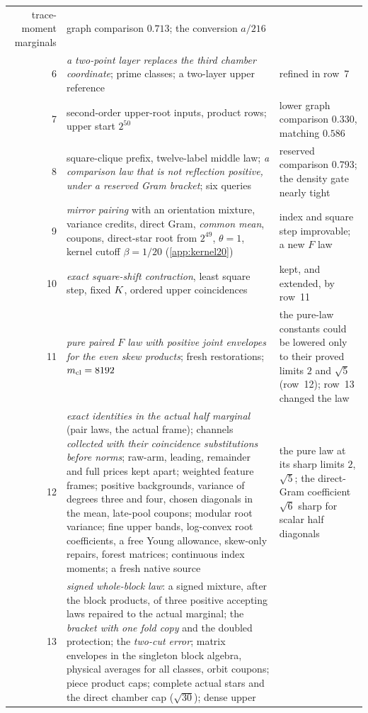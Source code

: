 {\begin{longtable}{@{}r>{\raggedright\arraybackslash}p{}>{\raggedright\arraybackslash}p{}@{}}
 trace-moment marginals & graph comparison $0.713$; the conversion $a/216$\\
6 & \emph{a two-point layer replaces the third chamber coordinate}; prime
 classes; a two-layer upper reference & refined in row~7\\
7 & second-order upper-root inputs, product rows; upper start $2^{50}$ &
 lower graph comparison $0.330$, matching $0.586$\\
8 & square-clique prefix, twelve-label middle law; \emph{a comparison law that
 is not reflection positive, under a reserved Gram bracket}; six queries &
 reserved comparison $0.793$; the density gate nearly tight\\
9 & \emph{mirror pairing} with an orientation mixture, variance credits,
 direct Gram, \emph{common mean}, coupons, direct-star root from $2^{49}$,
 $\theta=1$, kernel cutoff $\beta=1/20$ (\cref{app:kernel20}) &
 index and square step improvable; a new $F$ law\\
10 & \emph{exact square-shift contraction}, least square step, fixed $K$,
 ordered upper coincidences & kept, and extended, by row~11\\
11 & \emph{pure paired $F$ law with positive joint envelopes for the even skew
 products}; fresh restorations; $m_{\mathrm{cl}}=8192$ &
 the pure-law constants could be lowered only to their proved limits $2$ and
 $\sqrt5$ (row~12); row~13 changed the law\\
12 & \emph{exact identities in the actual half marginal} (pair laws, the actual
 frame); channels \emph{collected with their coincidence substitutions before
 norms}; raw-arm, leading, remainder and full prices kept apart; weighted
 feature frames; positive backgrounds, variance of degrees three and four,
 chosen diagonals in the mean, late-pool coupons; modular root variance; fine
 upper bands, log-convex root coefficients, a free Young allowance, skew-only
 repairs, forest matrices; continuous index moments; a fresh native source &
 the pure law at its sharp limits $2$, $\sqrt5$; the direct-Gram coefficient
 $\sqrt6$ sharp for scalar half diagonals\\
13 & \emph{signed whole-block law}: a signed mixture, after the block products,
 of three positive accepting laws repaired to the actual marginal; the
 \emph{bracket with one fold copy} and the doubled protection; the
 \emph{two-cut error}; matrix envelopes in the singleton block algebra,
 physical averages for all classes, orbit coupons; piece product caps;
 complete actual stars and the direct chamber cap ($\sqrt{30}$); dense upper

\end{longtable}}
